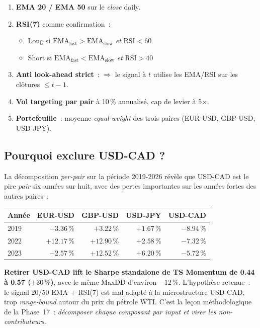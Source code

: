\begin{enumerate}
\item \textbf{EMA 20 / EMA 50} sur le \emph{close} daily.
\item \textbf{RSI(7)} comme confirmation~:
  \begin{itemize}
  \item Long si $\mathrm{EMA}_{\mathrm{fast}} > \mathrm{EMA}_{\mathrm{slow}}$ \emph{et} $\mathrm{RSI} < 60$
  \item Short si $\mathrm{EMA}_{\mathrm{fast}} < \mathrm{EMA}_{\mathrm{slow}}$ \emph{et} $\mathrm{RSI} > 40$
  \end{itemize}
\item \textbf{Anti look-ahead strict}~:  $\Rightarrow$ le signal à $t$ utilise les EMA/RSI sur les clôtures $\le t-1$.
\item \textbf{Vol targeting par pair} à 10\,\% annualisé, cap de levier à 5$\times$.
\item \textbf{Portefeuille}~: moyenne \emph{equal-weight} des trois paires (EUR-USD, GBP-USD, USD-JPY).
\end{enumerate}

\subsection{Pourquoi exclure USD-CAD ?}

La décomposition \emph{per-pair} sur la période 2019-2026 révèle que USD-CAD est le pire \emph{pair} six années sur huit, avec des pertes importantes sur les années fortes des autres paires~:

\begin{center}
\renewcommand{\arraystretch}{1.1}
\begin{tabular}{lrrrr}
\toprule
\textbf{Année} & \textbf{EUR-USD} & \textbf{GBP-USD} & \textbf{USD-JPY} & \textbf{USD-CAD} \\
\midrule
2019 & $-3.36$\,\% & $+3.22$\,\% & $+1.67$\,\% & \textcolor{combinedBurgundy}{$-8.94$\,\%} \\
2022 & $+12.17$\,\% & $+12.90$\,\% & $+2.58$\,\% & \textcolor{combinedBurgundy}{$-7.32$\,\%} \\
2023 & $-2.57$\,\% & $+12.52$\,\% & $+6.20$\,\% & \textcolor{combinedBurgundy}{$-5.72$\,\%} \\
\bottomrule
\end{tabular}
\end{center}

\textbf{Retirer USD-CAD lift le Sharpe standalone de TS Momentum de 0.44 à 0.57 ($+30\,\%$)}, avec le même MaxDD d'environ $-12\,\%$. L'hypothèse retenue~: le signal $20/50$ EMA + RSI(7) est mal adapté à la microstructure USD-CAD, trop \emph{range-bound} autour du prix du pétrole WTI. C'est la leçon méthodologique de la Phase~17~: \emph{décomposer chaque composant par input et virer les non-contributeurs}.

